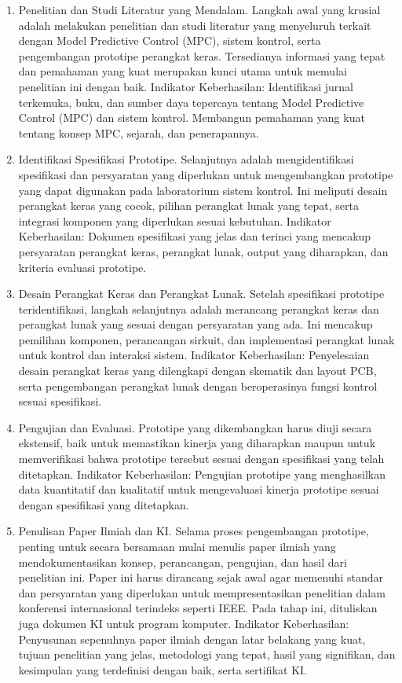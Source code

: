 \begin{enumerate}
    \item Penelitian dan Studi Literatur yang Mendalam.  Langkah awal yang krusial adalah melakukan penelitian dan studi literatur yang menyeluruh terkait dengan Model Predictive Control (MPC), sistem kontrol, serta pengembangan prototipe perangkat keras. Tersedianya informasi yang tepat dan pemahaman yang kuat merupakan kunci utama untuk memulai penelitian ini dengan baik. Indikator Keberhasilan: Identifikasi jurnal terkemuka, buku, dan sumber daya tepercaya tentang Model Predictive Control (MPC) dan sistem kontrol. Membangun pemahaman yang kuat tentang konsep MPC, sejarah, dan penerapannya.
    \item Identifikasi Spesifikasi Prototipe. Selanjutnya adalah mengidentifikasi spesifikasi dan persyaratan yang diperlukan untuk mengembangkan prototipe yang dapat digunakan pada laboratorium sistem kontrol. Ini meliputi desain perangkat keras yang cocok, pilihan perangkat lunak yang tepat, serta integrasi komponen yang diperlukan sesuai kebutuhan. Indikator Keberhasilan: Dokumen spesifikasi yang jelas dan terinci yang mencakup persyaratan perangkat keras, perangkat lunak, output yang diharapkan, dan kriteria evaluasi prototipe.
    \item Desain Perangkat Keras dan Perangkat Lunak. Setelah spesifikasi prototipe teridentifikasi, langkah selanjutnya adalah merancang perangkat keras dan perangkat lunak yang sesuai dengan persyaratan yang ada. Ini mencakup pemilihan komponen, perancangan sirkuit, dan implementasi perangkat lunak untuk kontrol dan interaksi sistem. Indikator Keberhasilan: Penyelesaian desain perangkat keras yang dilengkapi dengan skematik dan layout PCB, serta pengembangan perangkat lunak dengan beroperasinya fungsi kontrol sesuai spesifikasi.
    \item Pengujian dan Evaluasi. Prototipe yang dikembangkan harus diuji secara ekstensif, baik untuk memastikan kinerja yang diharapkan maupun untuk memverifikasi bahwa prototipe tersebut sesuai dengan spesifikasi yang telah ditetapkan. Indikator Keberhasilan: Pengujian prototipe yang menghasilkan data kuantitatif dan kualitatif untuk mengevaluasi kinerja prototipe sesuai dengan spesifikasi yang ditetapkan.
    \item Penulisan Paper Ilmiah dan KI. Selama proses pengembangan prototipe, penting untuk secara bersamaan mulai menulis paper ilmiah yang mendokumentasikan konsep, perancangan, pengujian, dan hasil dari penelitian ini. Paper ini harus dirancang sejak awal agar memenuhi standar dan persyaratan yang diperlukan untuk mempresentasikan penelitian dalam konferensi internasional terindeks seperti IEEE. Pada tahap ini, dituliskan juga dokumen KI untuk program komputer. Indikator Keberhasilan: Penyusunan sepenuhnya paper ilmiah dengan latar belakang yang kuat, tujuan penelitian yang jelas, metodologi yang tepat, hasil yang signifikan, dan kesimpulan yang terdefinisi dengan baik, serta sertifikat KI.

\end{enumerate}
